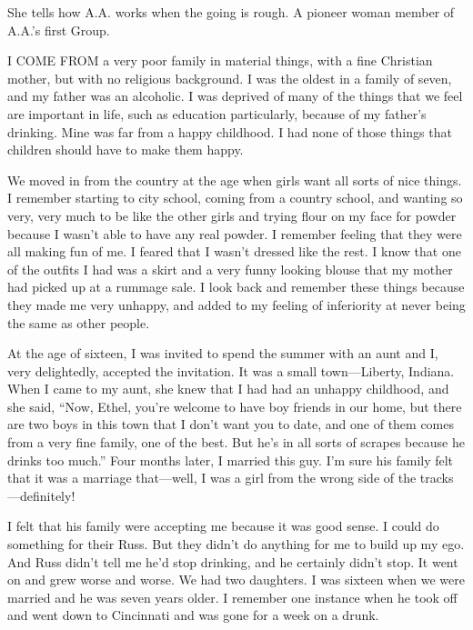 

\bbChapterPreamble




\begin{biblechapter}
    She tells how A.A. works when the going is rough.
\verse A pioneer woman member of A.A.’s first Group.
\end{biblechapter}


\begin{biblechapter}
    I COME FROM a very poor family in material things, 
    with a fine Christian mother, 
    but with no religious background.
\verse I was the oldest in a family of seven, 
    and my father was an alcoholic.
\verse I was deprived of many of the things that we feel 
    are important in life, 
    such as education particularly, 
    because of my father’s drinking.
\verse Mine was far from a happy childhood.
\verse I had none of those things that children should have to make them happy.

\verse We moved in from the country at the age when girls want all sorts of nice things. I remember starting to city school, coming from a country school, and wanting so very, very much to be like the other girls and trying flour on my face for powder because I wasn’t able to have any real powder. I remember feeling that they were all making fun of me. I feared that I wasn’t dressed like the rest. I know that one of the outfits I had was a skirt and a very funny looking blouse that my mother had picked up at a rummage sale. I look back and remember these things because they made me very unhappy, and added to my feeling of inferiority at never being the same as other people.

At the age of sixteen, I was invited to spend the summer with an aunt and I, very delightedly, accepted the invitation. It was a small town—Liberty, Indiana. When I came to my aunt, she knew that I had had an unhappy childhood, and she said, “Now, Ethel, you’re welcome to have boy friends in our home, but there are two boys in this town that I don’t want you to date, and one of them comes from a very fine family, one of the best. But he’s in all sorts of scrapes because he drinks too much.” Four months later, I married this guy. I’m sure his family felt that it was a marriage that—well, I was a girl from the wrong side of the tracks—definitely!

I felt that his family were accepting me because it was good sense. I could do something for their Russ. But they didn’t do anything for me to build up my ego. And Russ didn’t tell me he’d stop drinking, and he certainly didn’t stop. It went on and grew worse and worse. We had two daughters. I was sixteen when we were married and he was seven years older. I remember one instance when he took off and went down to Cincinnati and was gone for a week on a drunk.


\end{biblechapter}
